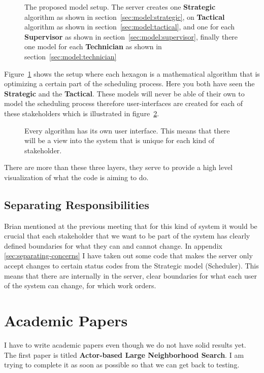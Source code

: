 \begin{figure}[H]
	\centering
    \drawModelSetupHexagon[userinterface=false, persistence=false, metaheuristics=true]
	\caption{The proposed model setup. The server creates one \textbf{Strategic} algorithm as shown in section~\ref{sec:model:strategic}, 
	on \textbf{Tactical} algorithm as shown in section~\ref{sec:model:tactical}, and 
	one for each \textbf{Supervisor} as shown in section~\ref{sec:model:supervisor}, 
	finally there one model for each \textbf{Technician} as shown in section~\ref{sec:model:technician}}
	\label{fig:hexagon:metaheuristics}
\end{figure}
Figure~\ref{fig:hexagon:metaheuristics} 
shows the setup where each hexagon is a mathematical algorithm that is optimizing
a certain part of the scheduling process. Here you both have seen the \textbf{Strategic}
and the \textbf{Tactical}. These models will never be able of their own to model the scheduling process therefore user-interfaces are 
created for each of these stakeholders which is illustrated in figure~\ref{fig:hexagon:userinterfaces}.

\begin{figure}[H]
	\centering
    \drawModelSetupHexagon[userinterface=true, persistence=false, metaheuristics=false]
	\caption{Every algorithm has its own user interface. This means that there will be a view into the system that is 
	unique for each kind of stakeholder.}
	\label{fig:hexagon:userinterfaces}
\end{figure}

There are more than these three layers, they serve to provide a high level visualization of what the code is aiming to do.

\subsection{Separating Responsibilities}
Brian mentioned at the previous meeting that for this kind of system it would be crucial that
each stakeholder that we want to be part of the system has clearly defined boundaries for what
they can and cannot change. In appendix \ref{sec:separating-concerns}
I have taken out some code that makes the server only accept changes to certain status codes from the 
Strategic model (Scheduler).
This means that there are internally in the server, clear boundaries for 
what each user of the system can change, for which work orders.

\section{Academic Papers}
I have to write academic papers even though we do not have solid results yet.
The first paper
is titled \textbf{Actor-based Large Neighborhood Search}. I am trying to complete it as 
soon as possible so that we can get back to testing.

